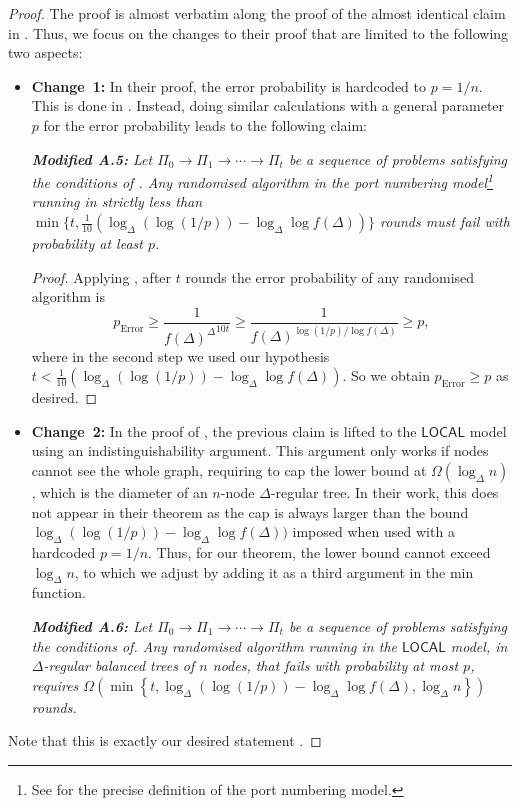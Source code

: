 \documentclass[letterpaper,11pt]{article}
\newcommand{\1}{\mathbb I}
\newcommand{\LOCAL}{\ensuremath{\mathsf{LOCAL}}\xspace}
\begin{document}
\begin{proof}
The proof is almost verbatim along the proof of the almost identical claim in \cite[Theorem 7.1]{BBKO22}. Thus, we focus on the changes to their proof that are limited to the following two aspects: 
\begin{itemize}
    \item \textbf{Change~1:} In their proof, the error probability is hardcoded to $p=1/n$. This is done in \cite[A.5]{BBKO22}. Instead, doing similar calculations with a general parameter $p$ for the error probability leads to the following claim:
    
    \smallskip
    
    \emph{\textbf{Modified A.5:} Let $\Pi_0 \rightarrow \Pi_1 \rightarrow \cdots \rightarrow \Pi_t$ be a sequence of problems satisfying the conditions
of . Any randomised algorithm in the port numbering model\footnote{See \cite{BBKO22} for the precise definition of the port numbering model.} running in strictly less than $\min\{t, \frac{1}{10}
(\log_{\Delta}(\log(1/p)) -
\log_{\Delta} \log f(\Delta))\}$ rounds must fail with probability at least $p$.}
%
\smallskip
%
\begin{proof}
    Applying \cite[Lemma A.4]{BBKO22}, after $t$ rounds the error probability of any randomised algorithm is 
% 
    $$
    p_{\text{Error}} \geq \frac{1}{{f(\Delta)^{\Delta}}^{10 t}} \geq \frac{1}{{f(\Delta)^{\log (1/ p) / \log f(\Delta)}}} \geq p,
    $$
%
where in the second step we used our hypothesis $t < \frac{1}{10}
(\log_{\Delta}( \log( 1/p)) - \log_{\Delta} \log f(\Delta))$. So we obtain $p_{\text{Error}} \geq p$ as desired.
\end{proof}    
%
\item \textbf{Change~2:} In the proof of \cite[A.6]{BBKO22}, the previous claim is lifted to the \LOCAL model using an indistinguishability argument. This argument only works if nodes cannot see the whole graph, requiring to cap the lower bound at $\Omega(\log_{\Delta}n)$, which is the diameter of an $n$-node $\Delta$-regular tree. In their work,  this does not appear in their theorem as the cap is always larger than the bound $\log_{\Delta}( \log( 1/p)) - \log_{\Delta} \log f(\Delta))$ imposed when used with a hardcoded $p=1/n$. Thus, for our theorem, the lower bound cannot exceed $\log_{\Delta}n$, to which we adjust by adding it as a third argument in the min function. 

\smallskip

\emph{\textbf{Modified A.6:} Let $\Pi_0 \rightarrow \Pi_1 \rightarrow \cdots \rightarrow \Pi_t$ be a sequence of problems satisfying the conditions of. Any randomised algorithm running in the \LOCAL model, in $\Delta$-regular balanced trees of $n$ nodes, that fails with probability at most $p$, requires $\Omega\left(\min\left\{t,\log_{\Delta}(\log( 1/p)) -\log_{\Delta}\log f(\Delta), \log_{\Delta} n \right\}\right)$ rounds.}
\end{itemize}

\smallskip

Note that this is exactly our desired statement .
\end{proof}
%
\end{document}
